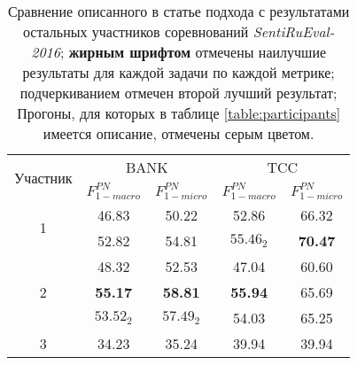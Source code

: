 \begin{table}[htp!]
\centering
\caption{Сравнение описанного в статье подхода с результатами остальных
    участников соревнований {\it SentiRuEval-2016}; {\bf жирным шрифтом}
    отмечены наилучшие результаты для каждой задачи по каждой метрике;
    подчеркиванием отмечен второй лучший результат;
    Прогоны, для которых в таблице \ref{table:participants} имеется
    описание, отмечены серым цветом.
}
\label{table:comparison}
\begin{tabular}{c|cccc}
\hline
\multicolumn{1}{l|}{\multirow{2}{*}{Участник}}                       & \multicolumn{2}{c|}{BANK}                                                         & \multicolumn{2}{c}{TCC}                                      \\ \cline{2-5}
\multicolumn{1}{l|}{}                                                & \multicolumn{1}{c|}{$F_{1-macro}^{PN}$} & \multicolumn{1}{c|}{$F_{1-micro}^{PN}$} & \multicolumn{1}{c|}{$F_{1-macro}^{PN}$} & $F_{1-micro}^{PN}$ \\ \hline
\multirow{2}{*}{1}          & \cellcolor[HTML]{C0C0C0}46.83          & \cellcolor[HTML]{C0C0C0}50.22           & \cellcolor[HTML]{C0C0C0}52.86           & \cellcolor[HTML]{C0C0C0}66.32                                \\
                            & 52.82                                  & 54.81                                   & $55.46_2$                               & \textbf{70.47}                                               \\ \cline{2-5}
\multirow{3}{*}{2}          & 48.32                                  & 52.53                                   & 47.04                                   & 60.60                                                        \\
                            & \cellcolor[HTML]{C0C0C0}\textbf{55.17} & \cellcolor[HTML]{C0C0C0}\textbf{58.81}  & \cellcolor[HTML]{C0C0C0}\textbf{55.94}  & \cellcolor[HTML]{C0C0C0}65.69                                \\
                            & $53.52_2$                              & $57.49_2$                               & 54.03                                   & 65.25                                                        \\ \cline{2-5}
3                           & 34.23                                  & 35.24                                   & 39.94                                   & 39.94                                                        \\ \cline{2-5}

\end{tabular}
\end{table}
